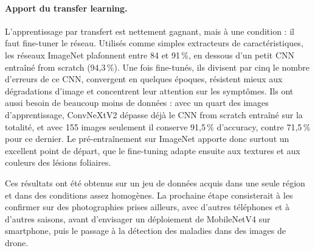 \paragraph{Apport du transfer learning.} L'apprentissage par transfert est nettement gagnant, mais à une condition : il faut fine-tuner le réseau. Utilisés comme simples extracteurs de caractéristiques, les réseaux ImageNet plafonnent entre 84 et 91\,\%, en dessous d'un petit CNN entraîné from scratch (94,3\,\%). Une fois fine-tunés, ils divisent par cinq le nombre d'erreurs de ce CNN, convergent en quelques époques, résistent mieux aux dégradations d'image et concentrent leur attention sur les symptômes. Ils ont aussi besoin de beaucoup moins de données : avec un quart des images d'apprentissage, ConvNeXtV2 dépasse déjà le CNN from scratch entraîné sur la totalité, et avec 155 images seulement il conserve 91,5\,\% d'accuracy, contre 71,5\,\% pour ce dernier. Le pré-entraînement sur ImageNet apporte donc surtout un excellent point de départ, que le fine-tuning adapte ensuite aux textures et aux couleurs des lésions foliaires.

Ces résultats ont été obtenus sur un jeu de données acquis dans une seule région et dans des conditions assez homogènes. La prochaine étape consisterait à les confirmer sur des photographies prises ailleurs, avec d'autres téléphones et à d'autres saisons, avant d'envisager un déploiement de MobileNetV4 sur smartphone, puis le passage à la détection des maladies dans des images de drone.
